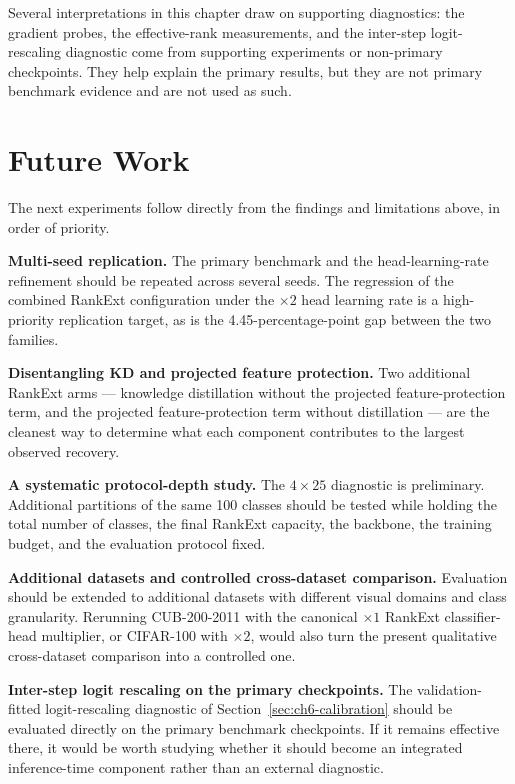 Several interpretations in this chapter draw on supporting diagnostics:
the gradient probes, the effective-rank measurements, and the inter-step
logit-rescaling diagnostic come from supporting experiments or non-primary
checkpoints. They help explain the primary results, but they are not
primary benchmark evidence and are not used as such.

\section{Future Work}
\label{sec:ch6-future-work}

The next experiments follow directly from the findings and limitations
above, in order of priority.

\textbf{Multi-seed replication.} The primary benchmark and the
head-learning-rate refinement should be repeated across several seeds. The
regression of the combined RankExt configuration under the $\times2$
head learning rate is a high-priority replication target, as is the
4.45-percentage-point gap between the two families.

\textbf{Disentangling KD and projected feature protection.} Two additional
RankExt arms --- knowledge distillation without the projected
feature-protection term, and the projected feature-protection term without
distillation --- are the cleanest way to determine what each component
contributes to the largest observed recovery.

\textbf{A systematic protocol-depth study.} The $4\times25$ diagnostic is
preliminary. Additional partitions of the same 100 classes should be tested
while holding the total number of classes, the final RankExt capacity, the
backbone, the training budget, and the evaluation protocol fixed.

\textbf{Additional datasets and controlled cross-dataset comparison.}
Evaluation should be extended to additional datasets with different visual
domains and class granularity. Rerunning CUB-200-2011 with the canonical
$\times1$ RankExt classifier-head multiplier, or CIFAR-100 with $\times2$,
would also turn the present qualitative cross-dataset comparison into a
controlled one.

\textbf{Inter-step logit rescaling on the primary checkpoints.} The
validation-fitted logit-rescaling diagnostic of
Section~\ref{sec:ch6-calibration} should be evaluated directly on the
primary benchmark checkpoints. If it remains effective there, it would be
worth studying whether it should become an integrated inference-time
component rather than an external diagnostic.


